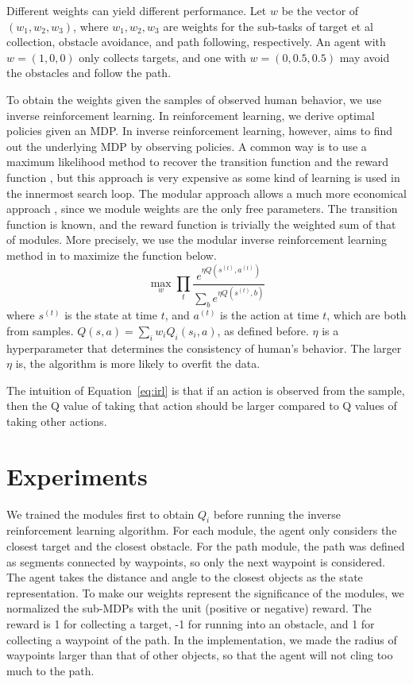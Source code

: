 Different weights can yield different performance. Let $w$ be the vector of
$(w_1, w_2, w_3)$, where $w_1, w_2, w_3$ are weights for the sub-tasks of target et al 
collection, obstacle avoidance, and path following, respectively. An agent with
$w = (1, 0, 0)$ only collects targets, and one with $w = (0, 0.5, 0.5)$ may
avoid the obstacles and follow the path.

To obtain the weights given the samples of observed human behavior, we use inverse
reinforcement learning. In reinforcement learning, we derive 
optimal policies given an MDP. In inverse reinforcement learning, however, aims to
find out the underlying MDP by observing policies. A common
way is to use a maximum likelihood method to recover the transition function and
the reward function \cite{ng2000algorithms}, but this approach is very expensive
as some kind of learning is used in the innermost search loop. The modular
approach allows a much more economical approach \cite{rothkopf2013modular},
since we module weights are the only free parameters. The transition function is
known, and the reward function is trivially the weighted sum of that of modules.
More precisely, we use the modular inverse reinforcement learning method in
\cite{rothkopf2013modular} to maximize the function below.
\begin{equation}
\label{eq:irl}
\max_w \prod_t \frac{e^{\eta Q(s^{(t)}, a^{(t)})}}{\sum_b e^{\eta Q(s^{(t)}, b)}}
\end{equation}
where $s^{(t)}$ is the state at time $t$, and $a^{(t)}$ is the action at time
$t$, which are both from samples. $Q(s, a) = \sum_i w_i Q_i(s_i, a)$, as defined
before. $\eta$ is a hyperparameter that determines the consistency of human's
behavior. The larger $\eta$ is, the algorithm is more likely to overfit the data.

The intuition of Equation~\ref{eq:irl} is that if an action is observed from the
sample, then the Q value of taking that action should be larger compared to Q
values of taking other actions.

\section{Experiments}
\label{sec:exp}

We trained the modules first to obtain $Q_i$ before running the inverse
reinforcement learning algorithm. For each module, the agent only considers the
closest target and the closest obstacle. For the path module, the path was
defined as segments connected by waypoints, so only the next waypoint is
considered. The agent takes the distance and angle to the closest objects as the
state representation. To make our weights represent the significance of the
modules, we normalized the sub-MDPs with the unit (positive or negative) reward.
The reward is 1 for collecting a target, -1 for running into an obstacle, and 1
for collecting a waypoint of the path. In the implementation, we made the radius
of waypoints larger than that of other objects, so that the agent will not cling
too much to the path.

